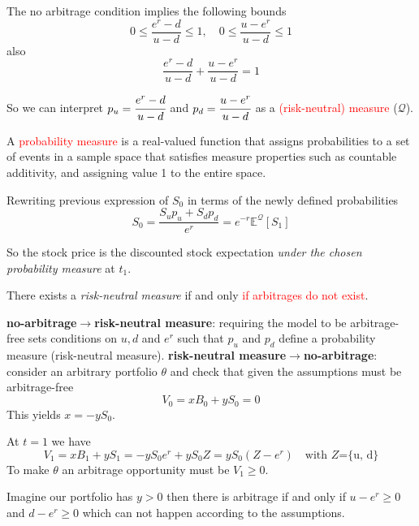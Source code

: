 \documentclass[12pt,a4paper]{article}
\begin{document}
The no arbitrage condition implies the following bounds
\begin{equation*}
\boxed{0\le\frac{e^r -d}{u-d}\le 1,\quad 0\le\frac{u - e^r}{u-d}\le 1}
\end{equation*}
also
\begin{equation}
\boxed{\frac{e^r -d}{u-d} + \frac{u - e^r}{u-d} = 1}
\label{eq:risk_neutral_probabilities}
\end{equation}

So we can interpret $p_u=\cfrac{e^r -d}{u-d}$ and $p_d=\cfrac{u - e^r}{u-d}$ as a \textcolor{red}{(risk-neutral) measure} ($\mathcal{Q}$).\vspace{0.3cm}
		
A \textcolor{red}{probability measure} is a real-valued function that assigns probabilities to a set of events in a sample space that satisfies measure properties such as countable additivity, and assigning value 1 to the entire space.

Rewriting previous expression of $S_0$ in terms of the newly defined probabilities
\begin{equation}
S_0 = \frac{S_up_u + S_dp_d}{e^r} = e^{-r}\mathbb{E}^\mathcal{Q}[S_1]
\label{eq:risk_neutral_price}
\end{equation}
		
So the stock price is the discounted stock expectation \emph{under the chosen probability measure} at $t_1$.
	
There exists a \emph{risk-neutral measure} if and only \textcolor{red}{if arbitrages do not exist}.

\textbf{no-arbitrage$\rightarrow$risk-neutral measure}: requiring the model to be arbitrage-free sets conditions on $u, d$ and $e^r$ such that $p_u$ and $p_d$ define a probability measure (risk-neutral measure).
\textbf{risk-neutral measure$\rightarrow$no-arbitrage}: consider an arbitrary portfolio $\theta$ and check that given the assumptions must be arbitrage-free
\begin{equation*}
V_0 = xB_0 + yS_0 = 0
\end{equation*}
This yields $x = -yS_0$.

At $t=1$ we have 
\begin{equation*}
V_1 = xB_1 + yS_1 = -yS_0e^r + yS_0Z = yS_0(Z - e^r)\quad\text{with $Z$=\{u, d\}}
\end{equation*}
To make $\theta$ an arbitrage opportunity must be $V_1\geq 0$.
			
Imagine our portfolio has $y > 0$ then there is arbitrage if and only if $u - e^r \geq 0$ and $d - e^r \geq 0$
which can not happen according to the assumptions. 
			
\end{document}
